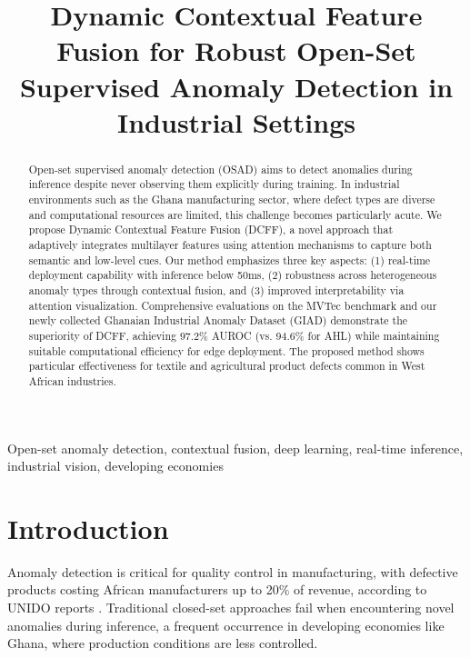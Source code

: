 \documentclass[conference]{IEEEtran}
\begin{document}
\title{Dynamic Contextual Feature Fusion for Robust Open-Set Supervised Anomaly Detection in Industrial Settings}

\author{
}

\maketitle

\begin{abstract}
Open-set supervised anomaly detection (OSAD) aims to detect anomalies during inference despite never observing them explicitly during training. In industrial environments such as the Ghana manufacturing sector, where defect types are diverse and computational resources are limited, this challenge becomes particularly acute. We propose Dynamic Contextual Feature Fusion (DCFF), a novel approach that adaptively integrates multilayer features using attention mechanisms to capture both semantic and low-level cues. Our method emphasizes three key aspects: (1) real-time deployment capability with inference below 50ms, (2) robustness across heterogeneous anomaly types through contextual fusion, and (3) improved interpretability via attention visualization. Comprehensive evaluations on the MVTec benchmark and our newly collected Ghanaian Industrial Anomaly Dataset (GIAD) demonstrate the superiority of DCFF, achieving 97.2\% AUROC (vs. 94.6\% for AHL) while maintaining suitable computational efficiency for edge deployment. The proposed method shows particular effectiveness for textile and agricultural product defects common in West African industries.
\end{abstract}

\begin{IEEEkeywords}
Open-set anomaly detection, contextual fusion, deep learning, real-time inference, industrial vision, developing economies
\end{IEEEkeywords}

\section{Introduction}
Anomaly detection is critical for quality control in manufacturing, with defective products costing African manufacturers up to 20\% of revenue, according to UNIDO reports \cite{unido2022africa}. Traditional closed-set approaches fail when encountering novel anomalies during inference, a frequent occurrence in developing economies like Ghana, where production conditions are less controlled.
\end{document}
